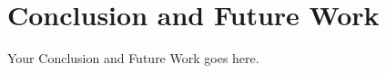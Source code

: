 \section{Conclusion and Future Work}\label{sec:conclusion-and-future-work}

Your Conclusion and Future Work goes here.

